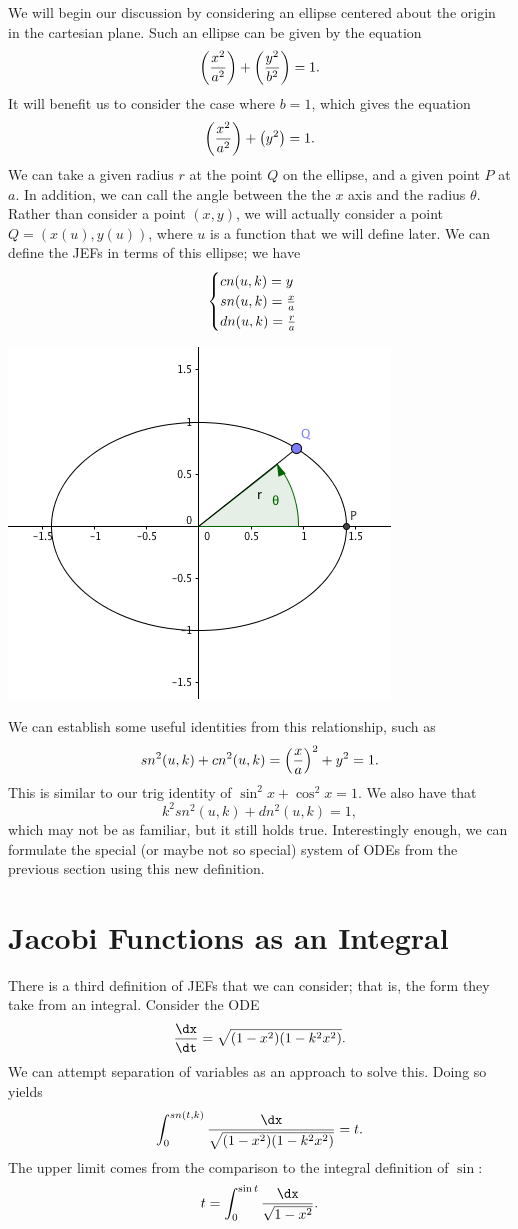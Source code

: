 \documentclass[notitlepage]{hw}
\begin{document}
We will begin our discussion by considering an ellipse centered about the origin in the cartesian plane.
Such an ellipse can be given by the equation
\[
\left({x^{2}\over a^{2}}\right) + \left({y^{2}\over b^{2}}\right) = 1.
\]
It will benefit us to consider the case where $b=1$, which gives the equation
\[
\left({x^{2}\over a^{2}}\right) + \left(y^{2}\right) = 1.
\]
We can take a given radius $r$ at the point $Q$ on the ellipse, and a given point $P$ at $a$. In
addition, we can call the angle between the the $x$ axis and the radius $\theta$. Rather than consider
a point $(x,y)$, we will actually consider a point $Q=(x(u),y(u))$, where $u$ is a function that we will
define later. We can define the JEFs in terms of this ellipse; we have
\[
\begin{cases}
cn(u,k)=y\\
sn(u,k)={x\over a}\\
dn(u,k)={r\over a}
\end{cases}
\]
\begin{center}
\includegraphics[scale=0.5]{ellipsis}
\end{center}
We can establish some useful identities from this relationship, such as
\[
sn^{2}(u,k)+cn^{2}(u,k)=\left({x\over a}\right)^{2}+y^{2} = 1.
\]
This is similar to our trig identity of $\sin^{2}{x}+\cos^{2}{x}=1$. We also have that
\[
k^{2}sn^{2}(u,k)+dn^{2}(u,k)=1,
\]
which may not be as familiar, but it still holds true. Interestingly enough, we can formulate the
special (or maybe not so special) system of ODEs from the previous section using this new definition.

\section{Jacobi Functions as an Integral}

There is a third definition of JEFs that we can consider; that is, the form they take from an integral.
Consider the ODE
\[
{\dx\over\dt}=\sqrt{(1-x^{2})(1-k^{2}x^{2})}.
\]
We can attempt separation of variables as an approach to solve this. Doing so yields
\[
\int_{0}^{sn(t,k)}{\dx\over\sqrt{(1-x^{2})(1-k^{2}x^{2})}}=t.
\]
The upper limit comes from the comparison to the integral definition of $\sin$:
\[
t=\int_{0}^{\sin{t}}{\dx\over\sqrt{1-x^{2}}}.
\]
\end{document}
